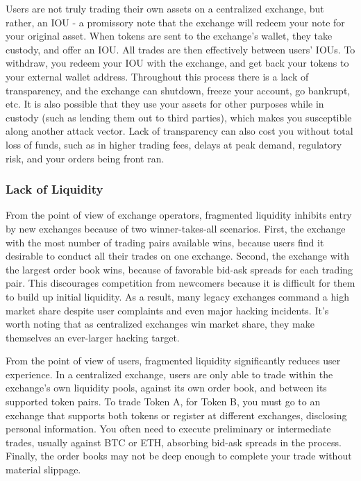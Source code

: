 \documentclass[UTF8,nofonts]{article}
\begin{document}
Users are not truly trading their own assets on a centralized exchange, but rather, an IOU - a promissory note that the exchange will redeem your note for your original asset. When tokens are sent to the exchange's wallet, they take custody, and offer an IOU. All trades are then effectively between users' IOUs. To withdraw, you redeem your IOU with the exchange, and get back your tokens to your external wallet address. Throughout this process there is a lack of transparency, and the exchange can shutdown, freeze your account, go bankrupt, etc. It is also possible that they use your assets for other purposes while in custody (such as lending them out to third parties), which makes you susceptible along another attack vector. Lack of transparency can also cost you without total loss of funds, such as in higher trading fees, delays at peak demand, regulatory risk, and your orders being front ran.

\subsubsection{Lack of Liquidity}
From the point of view of exchange operators, fragmented liquidity inhibits entry by new exchanges because of two winner-takes-all scenarios. First, the exchange with the most number of trading pairs available wins, because users find it desirable to conduct all their trades on one exchange. Second, the exchange with the largest order book wins, because of favorable bid-ask spreads for each trading pair. This discourages competition from newcomers because it is difficult for them to build up initial liquidity. As a result, many legacy exchanges command a high market share despite user complaints and even major hacking incidents. It’s worth noting that as centralized exchanges win market share, they make themselves an ever-larger hacking target. 

From the point of view of users, fragmented liquidity significantly reduces user experience. In a centralized exchange, users are only able to trade within the exchange's own liquidity pools, against its own order book, and between its supported token pairs. To trade Token A, for Token B, you must go to an exchange that supports both tokens or register at different exchanges, disclosing personal information. You often need to execute preliminary or intermediate trades, usually against BTC or ETH, absorbing bid-ask spreads in the process. Finally, the order books may not be deep enough to complete your trade without material slippage.
\end{document}
